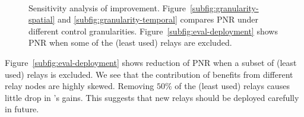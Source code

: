 \begin{figure}[t!]
\centering
\hspace{-0.5cm}
\\
\caption{Sensitivity analysis of \hybrid improvement. 
Figure~\ref{subfig:granularity-spatial} and \ref{subfig:granularity-temporal} compares PNR under different control granularities. Figure~\ref{subfig:eval-deployment} shows PNR when some of the (least used) relays are excluded.}
\label{fig:eval-granularity}
\end{figure}


Figure~\ref{subfig:eval-deployment} shows reduction of PNR when a subset of (least used) relays is excluded. We see that the contribution of benefits from different relay nodes are highly skewed. Removing $50\%$ of the (least used) relays causes little drop in \hybrid's gains. This suggests that new relays should be deployed carefully in future. 

